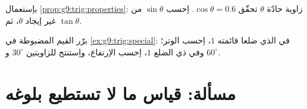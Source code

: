 \begin{exercise}[$\star\star$]\label{exo:g9:trig:8}
باِستعمال \cref{prop:g9:trig:properties}: زاوية حادّة $\theta$
تحقّق $\cos\theta = 0.6$. اِحسب $\sin\theta$ من غير إيجاد
$\theta$، ثم $\tan\theta$.
\end{exercise}

\begin{exercise}[$\star\star\star$]\label{exo:g9:trig:9}
برّر القيم المضبوطة في \cref{ex:g9:trig:special}: في   الذي ضلعا قائمته $1$، اِحسب
الوتر؛ وفي  ذي الضلع $1$، اِحسب
الاِرتفاع، واِستنتج   للزاويتين $30^\circ$
و $60^\circ$.
\end{exercise}

\section{مسألة: قياس ما لا تستطيع بلوغه}

